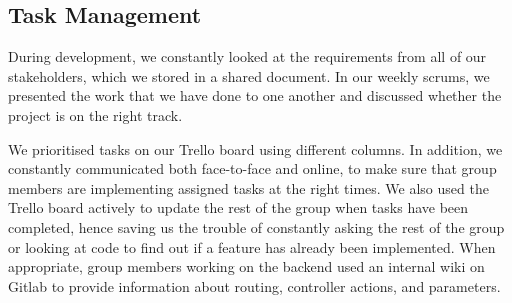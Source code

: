 \documentclass[a4paper, titlepage]{article}
\begin{document}
\subsection{Task Management}
During development, we constantly looked at the requirements from all of our stakeholders, which we stored in a shared document. In our weekly scrums, we presented the work that we have done to one another and discussed whether the project is on the right track.

We prioritised tasks on our Trello board using different columns. In addition, we constantly communicated both face-to-face and online, to make sure that group members are implementing assigned tasks at the right times. We also used the Trello board actively to update the rest of the group when tasks have been completed, hence saving us the trouble of constantly asking the rest of the group or looking at code to find out if a feature has already been implemented. When appropriate, group members working on the backend used an internal wiki on Gitlab to provide information about routing, controller actions, and parameters. 
\end{document}
